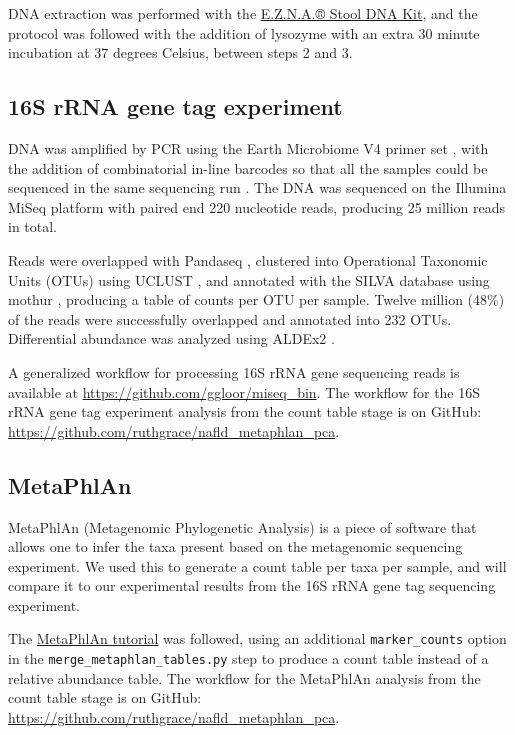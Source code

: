 DNA extraction was performed with the \href{http://omegabiotek.com/store/product/stool-dna-kit/}{E.Z.N.A.® Stool DNA Kit}, and the protocol was followed with the addition of lysozyme with an extra 30 minute incubation at 37 degrees Celsius, between steps 2 and 3.

\subsection{16S rRNA gene tag experiment}

DNA was amplified by PCR using the Earth Microbiome V4 primer set \cite{caporaso2012ultra}, with the addition of combinatorial in-line barcodes so that all the samples could be sequenced in the same sequencing run \cite{gloor2010microbiome}. The DNA was sequenced on the Illumina MiSeq platform with paired end 220 nucleotide reads, producing 25 million reads in total.

Reads were overlapped with Pandaseq \cite{masella2012pandaseq}, clustered into Operational Taxonomic Units (OTUs) using UCLUST \cite{edgar2010search}, and annotated with the SILVA database \cite{quast2013silva} using mothur \cite{schloss2009introducing}, producing a table of counts per OTU per sample. Twelve million (48\%) of the reads were successfully overlapped and annotated into 232 OTUs. Differential abundance was analyzed using ALDEx2 \cite{fernandes2014unifying}.

A generalized workflow for processing 16S rRNA gene sequencing reads is available at \url{https://github.com/ggloor/miseq_bin}. The workflow for the 16S rRNA gene tag experiment analysis from the count table stage is on GitHub: \url{https://github.com/ruthgrace/nafld_metaphlan_pca}.

\subsection{MetaPhlAn}

MetaPhlAn (Metagenomic Phylogenetic Analysis) \cite{segata2012metagenomic} is a piece of software that allows one to infer the taxa present based on the metagenomic sequencing experiment. We used this to generate a count table per taxa per sample, and will compare it to our experimental results from the 16S rRNA gene tag sequencing experiment.

The \href{https://bitbucket.org/nsegata/metaphlan/wiki/MetaPhlAn_Pipelines_Tutorial}{MetaPhlAn tutorial} was followed, using an additional \verb|marker_counts| option in the \verb|merge_metaphlan_tables.py| step to produce a count table instead of a relative abundance table. The workflow for the MetaPhlAn analysis from the count table stage is on GitHub: \url{https://github.com/ruthgrace/nafld_metaphlan_pca}.

